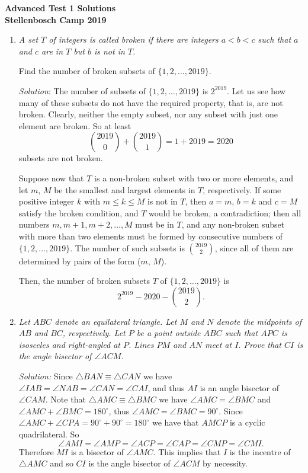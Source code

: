 \documentclass{article}
\begin{document}
\begin{center}
  \textbf{\Large Advanced Test 1 Solutions}
  \\ \vspace{1em}
  \textbf{\large Stellenbosch Camp 2019}
\end{center}


\begin{enumerate}[1.]

\item %
{\itshape
A set $T$ of integers is called \emph{broken} if there are integers $a < b < c$ such that $a$ and $c$ are in $T$ but $b$ is not in $T$.

Find the number of broken subsets of $\{1, 2, \dotsc, 2019\}$.}

\textit{Solution}:
The number of subsets of $\{1, 2, \dots, 2019\}$ is $2^{2019}$. Let us see how many of these subsets do not have the required property, that is, are not broken.
Clearly, neither the empty subset, nor any subset with just one element are broken. So at least
$$\binom{2019}{0} + \binom{2019}{1} = 1 + 2019 = 2020$$
subsets are not broken.

Suppose now that $T$ is a non-broken subset with two or more elements, and let $m$, $M$ be the smallest and largest elements in $T$, respectively.
If some positive integer $k$ with $m \le k \le M$ is not in $T$, then $a = m$, $b = k$ and $c = M$ satisfy the broken condition, and $T$ would be broken, a contradiction; then all numbers $m, m + 1, m + 2, \dots, M$ must be in $T$, and any non-broken subset with more than two elements must be formed by consecutive numbers of $\{1, 2, \dots, 2019\}$.
The number of such subsets is $\binom{2019}{2}$, since all of them are determined by pairs of the form ($m$, $M$).

Then, the number of broken subsets $T$ of $\{1, 2, \dots, 2019\}$ is
\[ 2^{2019} - 2020 - \binom{2019}{2}. \]


\item %
{\itshape
Let $ABC$ denote an equilateral triangle.
Let $M$ and $N$ denote the midpoints of $AB$ and $BC$, respectively.
Let $P$ be a point outside $ABC$ such that $APC$ is isosceles and right-angled at $P$.
Lines $PM$ and $AN$ meet at $I$.
Prove that $CI$ is the angle bisector of $\angle ACM$.}

\textit{Solution:}
Since $\triangle BAN \equiv \triangle CAN$ we have $\angle IAB = \angle NAB = \angle CAN = \angle CAI $, and thus $AI$ is an angle bisector of $\angle CAM$. Note that $\triangle AMC \equiv \triangle BMC$ we have $\angle AMC = \angle BMC$ and $\angle AMC + \angle BMC =180^\circ$, thus $\angle AMC = \angle BMC = 90^\circ$. Since $\angle AMC + \angle CPA = 90^\circ +90^\circ =180^\circ$ we have that $AMCP$ is a cyclic quadrilateral. So
\[ \angle AMI = \angle AMP = \angle ACP = \angle CAP = \angle CMP = \angle CMI. \]
Therefore $MI$ is a bisector of $\angle AMC$. This implies that $I$ is the incentre of $\triangle AMC$ and so $CI$ is the angle bisector of $\angle ACM$ by necessity.



\end{enumerate}
\end{document}
